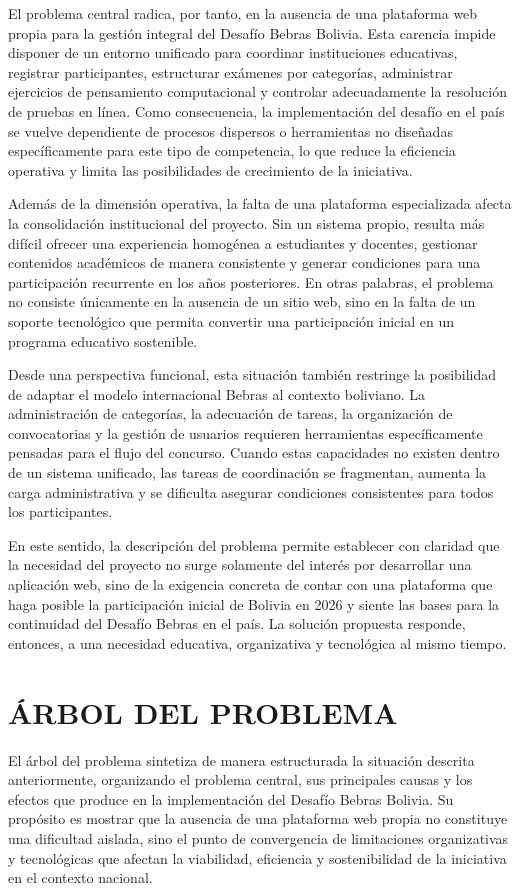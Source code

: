 El problema central radica, por tanto, en la ausencia de una plataforma web propia para la gestión integral del Desafío Bebras Bolivia. Esta carencia impide disponer de un entorno unificado para coordinar instituciones educativas, registrar participantes, estructurar exámenes por categorías, administrar ejercicios de pensamiento computacional y controlar adecuadamente la resolución de pruebas en línea. Como consecuencia, la implementación del desafío en el país se vuelve dependiente de procesos dispersos o herramientas no diseñadas específicamente para este tipo de competencia, lo que reduce la eficiencia operativa y limita las posibilidades de crecimiento de la iniciativa.

Además de la dimensión operativa, la falta de una plataforma especializada afecta la consolidación institucional del proyecto. Sin un sistema propio, resulta más difícil ofrecer una experiencia homogénea a estudiantes y docentes, gestionar contenidos académicos de manera consistente y generar condiciones para una participación recurrente en los años posteriores. En otras palabras, el problema no consiste únicamente en la ausencia de un sitio web, sino en la falta de un soporte tecnológico que permita convertir una participación inicial en un programa educativo sostenible.

Desde una perspectiva funcional, esta situación también restringe la posibilidad de adaptar el modelo internacional Bebras al contexto boliviano. La administración de categorías, la adecuación de tareas, la organización de convocatorias y la gestión de usuarios requieren herramientas específicamente pensadas para el flujo del concurso. Cuando estas capacidades no existen dentro de un sistema unificado, las tareas de coordinación se fragmentan, aumenta la carga administrativa y se dificulta asegurar condiciones consistentes para todos los participantes.

En este sentido, la descripción del problema permite establecer con claridad que la necesidad del proyecto no surge solamente del interés por desarrollar una aplicación web, sino de la exigencia concreta de contar con una plataforma que haga posible la participación inicial de Bolivia en 2026 y siente las bases para la continuidad del Desafío Bebras en el país. La solución propuesta responde, entonces, a una necesidad educativa, organizativa y tecnológica al mismo tiempo.

\clearpage
\section{ÁRBOL DEL PROBLEMA}

El árbol del problema sintetiza de manera estructurada la situación descrita anteriormente, organizando el problema central, sus principales causas y los efectos que produce en la implementación del Desafío Bebras Bolivia. Su propósito es mostrar que la ausencia de una plataforma web propia no constituye una dificultad aislada, sino el punto de convergencia de limitaciones organizativas y tecnológicas que afectan la viabilidad, eficiencia y sostenibilidad de la iniciativa en el contexto nacional.


